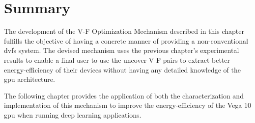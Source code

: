 \section{Summary}

The development of the V-F Optimization Mechanism described in this chapter fulfills the objective of having a concrete manner of providing a non-conventional \acrshort{dvfs} system. The devised mechanism uses the previous chapter's experimental results to enable a final user to use the uncover V-F pairs to extract better energy-efficiency of their devices without having any detailed knowledge of the \acrshort{gpu} architecture.

The following chapter provides the application of both the characterization and implementation of this mechanism to improve the energy-efficiency of the Vega 10 \acrshort{gpu} when running deep learning applications.